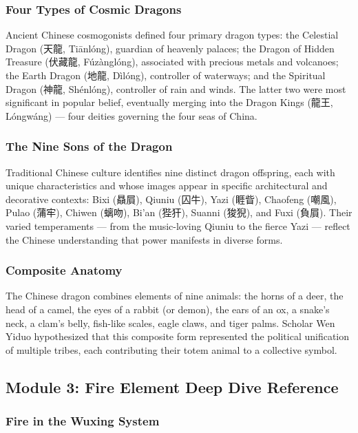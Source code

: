 \documentclass[11pt,letterpaper]{article}
\begin{document}
\subsubsection{Four Types of Cosmic Dragons}

Ancient Chinese cosmogonists defined four primary dragon types: the Celestial Dragon (天龍, Tiānlóng), guardian of heavenly palaces; the Dragon of Hidden Treasure (伏藏龍, Fúzànglóng), associated with precious metals and volcanoes; the Earth Dragon (地龍, Dìlóng), controller of waterways; and the Spiritual Dragon (神龍, Shénlóng), controller of rain and winds. The latter two were most significant in popular belief, eventually merging into the Dragon Kings (龍王, Lóngwáng) --- four deities governing the four seas of China.

\subsubsection{The Nine Sons of the Dragon}

Traditional Chinese culture identifies nine distinct dragon offspring, each with unique characteristics and whose images appear in specific architectural and decorative contexts: Bixi (贔屓), Qiuniu (囚牛), Yazi (睚眥), Chaofeng (嘲風), Pulao (蒲牢), Chiwen (螭吻), Bi'an (狴犴), Suanni (狻猊), and Fuxi (負屓). Their varied temperaments --- from the music-loving Qiuniu to the fierce Yazi --- reflect the Chinese understanding that power manifests in diverse forms.

\subsubsection{Composite Anatomy}

The Chinese dragon combines elements of nine animals: the horns of a deer, the head of a camel, the eyes of a rabbit (or demon), the ears of an ox, a snake's neck, a clam's belly, fish-like scales, eagle claws, and tiger palms. Scholar Wen Yiduo hypothesized that this composite form represented the political unification of multiple tribes, each contributing their totem animal to a collective symbol.

\subsection{Module 3: Fire Element Deep Dive Reference}

\subsubsection{Fire in the Wuxing System}
\end{document}
